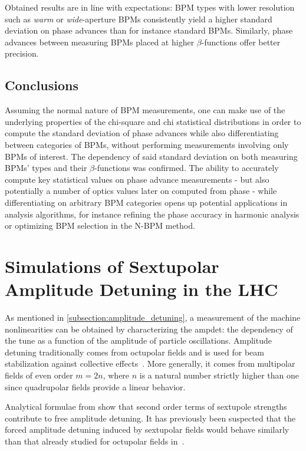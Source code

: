 Obtained results are in line with expectations: BPM types with lower resolution such as \textit{warm} or \textit{wide}-aperture BPMs consistently yield a higher standard deviation on phase advances than for instance standard BPMs.
Similarly, phase advances between measuring BPMs placed at higher \(\beta\)-functions offer better precision.

\subsection*{Conclusions}

Assuming the normal nature of BPM measurements, one can make use of the underlying properties of the chi-square and chi statistical distributions in order to compute the standard deviation of phase advances while also differentiating between categories of BPMs, without performing measurements involving only BPMs of interest.
The dependency of said standard deviation on both measuring BPMs' types and their \(\beta\)-functions was confirmed.
The ability to accurately compute key statistical values on phase advance measurements - but also potentially a number of optics values later on computed from phase - while differentiating on arbitrary BPM categories opens up potential applications in analysis algorithms, for instance refining the phase accuracy in harmonic analysis or optimizing BPM selection in the N-BPM method.

\section{Simulations of Sextupolar Amplitude Detuning in the LHC}
\label{section:sextupolar_amplitude_detuning}

As mentioned in \cref{subsection:amplitude_detuning}, a measurement of the machine nonlinearities can be obtained by characterizing the \gls{ampdet}: the dependency of the tune as a function of the amplitude of particle oscillations.
Amplitude detuning traditionally comes from octupolar fields and is used for beam stabilization against collective effects~\cite{BOOK:Chao:Collective_instabilities,PRAB:Karpov:Thresholds_Loss_Landau_Damping}.
More generally, it comes from multipolar fields of even order \(m = 2n\), where \(n\) is a natural number strictly higher than one since quadrupolar fields provide a linear behavior.

Analytical formulae from \cite{REPORT:Bengtsson:Smear_Tune_Shift, BOOK:Lee:Accelerator_physics,BOOK:Chao:Handbook_Accelerator_Physics_Engineering} show that second order terms of sextupole strengths contribute to free amplitude detuning.
It has previously been suspected that the forced amplitude detuning induced by sextupolar fields would behave similarly than that already studied for octupolar fields in~\cite{PRAB:White:Direct_Amplitude_Detuning_AC_Dipole}.

